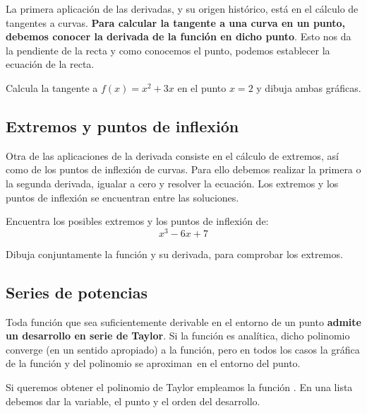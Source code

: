 \documentclass[a4paper,10pt, draft]{article}
\newcommand{\com}[1]{\textbf{\color{blue}{#1}}}
\newenvironment{ejer}{\begin{tcolorbox}[center title, title=Ejercicios,
fonttitle=\sffamily\bfseries,colback=blue!5,colframe=orange]}{\end{tcolorbox}}
\begin{document}
La primera aplicación de las derivadas, y su origen histórico, está en el cálculo de tangentes a curvas. \textbf{Para calcular la tangente a una curva en un punto, debemos conocer la derivada de la función en dicho punto}. Esto nos da la pendiente de la recta y como conocemos el punto, podemos establecer la ecuación de la recta.

\begin{ejer}

Calcula la tangente a $f(x)=x^2+3x$ en el punto $x=2$ y dibuja ambas gráficas.

\end{ejer}  \newpage

\subsection{Extremos y puntos de inflexión}

Otra de las aplicaciones de la derivada consiste en el cálculo de extremos, así como de los puntos de inflexión de curvas. Para ello debemos realizar la primera o la segunda derivada, igualar a cero y resolver la ecuación. Los extremos y los puntos de inflexión se encuentran entre las soluciones.



\begin{ejer}

Encuentra los posibles extremos y los puntos de inflexión de:
$$
 x^3-6x+7
 $$
 
 Dibuja conjuntamente la función y su derivada, para comprobar los extremos.

\end{ejer} 


 \newpage

\subsection{Series de potencias}

Toda función que sea suficientemente derivable en el entorno de un punto \textbf{admite un desarrollo en serie de Taylor}. Si la función es analítica, dicho polinomio converge (en un sentido apropiado) a la función, pero en todos los casos la gráfica de la función y del polinomio se \guillemotleft aproximan\guillemotright\  en el entorno del punto.

Si queremos obtener el polinomio de Taylor empleamos la función \com{Series[f,\{$x,x_0,n$\}] }. En una lista debemos dar la variable, el punto y el orden del desarrollo.
\end{document}
